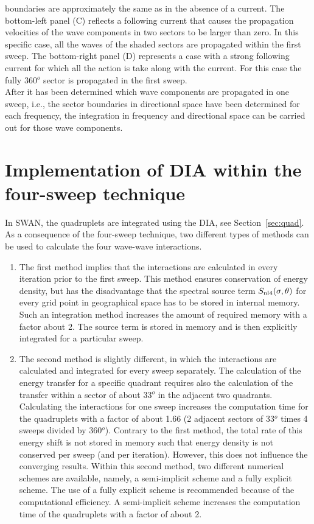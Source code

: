\documentclass[12pt]{book}
\begin{document}
boundaries are approximately the same as in the absence of a current. The bottom-left panel (C)
reflects a following current that causes the propagation velocities of the wave components in two
sectors to be larger than zero. In this specific case, all the waves of the shaded sectors are propagated
within the first sweep. The bottom-right panel (D) represents a case with a strong following current
for which all the action is take along with the current. For this case the fully 360$^o$ sector is
propagated in the first sweep.
\\[2ex]
\noindent
After it has been determined which wave components are propagated in one
sweep, i.e., the sector boundaries in directional space have been determined for each frequency, the
integration in frequency and directional space can be carried out for those wave components.

\section{Implementation of DIA within the four-sweep technique}

In SWAN, the quadruplets are integrated using the DIA, see Section~\ref{sec:quad}. As a
consequence of the four-sweep technique, two different types of methods can be used to calculate the
four wave-wave interactions.
\begin{enumerate}
\item
The first method implies that the interactions are calculated in every
iteration prior to the first sweep. This method ensures conservation of energy density, but has the
disadvantage that the spectral source term $S_{\rm nl4}(\sigma,\theta)$ for every grid point in
geographical space has to be stored in internal memory. Such an integration method increases the
amount of required memory with a factor about 2.
The source term is stored in memory and is then explicitly integrated for a particular sweep.
\item
The second method is slightly different, in which the interactions are
calculated and integrated for every sweep separately. The calculation of the energy transfer for a specific
quadrant requires also the calculation of the transfer within a sector of about 33$^o$ in the adjacent two
quadrants. Calculating the interactions for one sweep increases the
computation time for the quadruplets with a factor of about 1.66 (2 adjacent sectors of 33$^o$ times
4 sweeps divided by 360$^o$). Contrary to the first method, the total rate of this energy shift is
not stored in memory such that energy density is not conserved per sweep (and per iteration). However,
this does not influence the converging results.
Within this second method, two different numerical schemes are available, namely, a semi-implicit scheme
and a fully explicit scheme. The use of a fully explicit scheme is recommended because of the computational
efficiency. A semi-implicit scheme increases the computation time of the quadruplets with a factor of about 2.
\end{enumerate}
\end{document}

